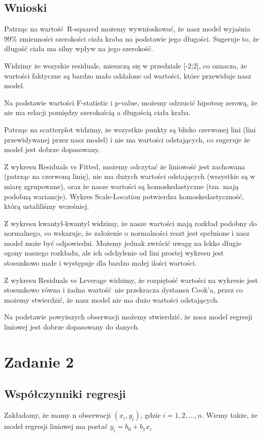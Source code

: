 \documentclass[11pt]{article}
\begin{document}
\pagebreak

\subsection{Wnioski}
Patrząc na wartość R-squared możemy wywnioskować, że nasz model wyjaśnia
99\% zmienności szerokości ciała kraba na podstawie jego długości. Sugeruje to,
że długość ciała ma silny wpływ na jego szerokość.

Widzimy że wszyskie residuals, mieszczą się w przedziale [-2;2], co oznacza,
że wartości faktyczne są bardzo mało oddalone od wartości, które przewiduje nasz
model.

Na podstawie wartości F-statistic i p-value, możemy odrzucić hipotezę zerową,
że nie ma relacji pomiędzy szerokością a długością ciała kraba.

Patrząc na scatterplot widzimy, że wszystkie punkty są blisko czerwonej lini
(lini przewidywanej przez nasz model) i nie ma wartości odstających, co sugeruje
że model jest dobrze dopasowany.

Z wykresu Residuals vs Fitted, możemy odczytać że liniowość jest zachowana
(patrząc na czerwoną linię), nie ma dużych wartości odstających (wszystkie są
w miarę zgrupowane), oraz że nasze wartości są homoskedastyczne (tzn. mają
podobną wariancje). Wykres Scale-Location potwierdza homoskedastyczność, którą
ustaliliśmy wcześniej.

Z wykresu kwantyl-kwantyl widzimy, że nasze wartości mają rozkład podobny do
normalnego, co wskazuje, że założenie o normalności reszt jest spełnione i nasz
model może być odpowiedni. Możemy jednak zwrócić uwagę na lekko długie ogony
naszego rozkładu, ale ich odchylenie od lini prostej wykresu jest stosunkowo
małe i występuje dla bardzo małej ilości wartości.

Z wykresu Residuals vs Leverage widzimy, że rozpiętość wartości na wykresie
jest stosunkowo równa i żadna wartość nie przekracza dystansu Cook'a, przez co
możemy stwierdzić, że nasz model nie ma dużo wartości odstających.

Na podstawie powyższych obserwacji możemy stwierdzić, że nasz model regresji
liniowej jest dobrze dopasowany do danych.

\pagebreak

\section{Zadanie 2}
\subsection{Współczynniki regresji}
Zakładamy, że mamy n obserwacji $(x_i,y_i)$, gdzie $i=1,2,\ldots,n$. Wiemy
także, że model regresji liniowej ma postać $y_i=b_0 + b_1 x_i$
\end{document}
